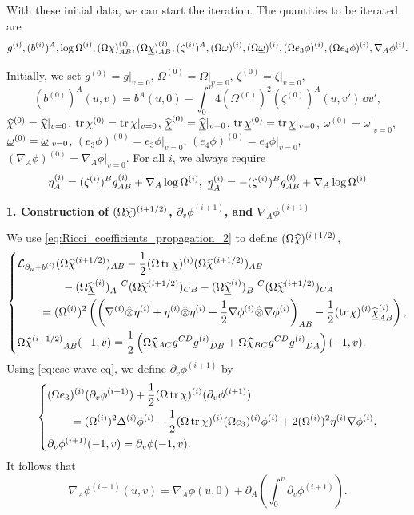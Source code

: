 With these initial data, we can start the iteration.
The quantities to be iterated are 
\[g^{(i)},(b^{(i)})^A,\log\Omega^{(i)},(\Omega\chi)^{(i)}_{AB},(\Omega\underline\chi)^{(i)}_{AB},(\zeta^{(i)})^A,(\Omega\omega)^{(i)},(\Omega\underline\omega)^{(i)},(\Omega e_3\phi)^{(i)}, (\Omega e_4\phi)^{(i)},\nabla_A\phi^{(i)} .\]

Initially, we set $g^{(0)}=g|_{v=0}$, $\Omega^{(0)}=\Omega|_{v=0}$, $\zeta^{(0)}=\zeta|_{v=0}$,
\[
 (b^{(0)})^A(u,v)=b^A(u,0)-\int_0^v4(\Omega^{(0)})^2
 (\zeta^{(0)})^A(u,v')\,\dd v',
\]
$\widehat\chi^{(0)}=\widehat\chi|_{v=0}$, $\operatorname{tr}\chi^{(0)}=\operatorname{tr}\chi|_{v=0}$, $\widehat{\underline\chi}^{(0)}=\widehat{\underline\chi}|_{v=0}$, $\operatorname{tr}\underline\chi^{(0)}=\operatorname{tr}\underline\chi|_{v=0}$, $\omega^{(0)}=\omega|_{v=0}$, $\underline\omega^{(0)}=\underline\omega|_{v=0}$, $(e_3\phi)^{(0)}=e_3\phi|_{v=0}$, $(e_4\phi)^{(0)}=e_4\phi|_{v=0}$, $(\nabla_A\phi)^{(0)}=\nabla_A\phi|_{v=0}$.
For all $i$, we always require 
\[\eta^{(i)}_A=(\zeta^{(i)})^B g^{(i)}_{AB}+\nabla_A\log\Omega^{(i)},\ \underline\eta^{(i)}_A=-(\zeta^{(i)})^B g^{(i)}_{AB}+\nabla_A\log\Omega^{(i)}\]

\noindent\textbf{1. Construction of $(\Omega\widehat\chi)^{(i+1/2)}$, $\partial_v\phi^{(i+1)}$, and $\nabla_A\phi^{(i+1)}$}

We use \eqref{eq:Ricci_coefficients_propagation_2} to define $(\Omega\widehat\chi)^{(i+1/2)}$,
\begin{equation}
    \left\{
    \begin{aligned}
        & \mathcal L_{\partial_u+b^{(i)}}(\Omega\widehat\chi^{(i+1/2)})_{AB}-\frac{1}{2}(\Omega\operatorname{tr}\underline\chi)^{(i)}(\Omega\widehat\chi^{(i+1/2)})_{AB}\\
        &\qquad\qquad -(\Omega\widehat{\underline\chi}^{(i)})_A^{\quad C}(\Omega\widehat\chi^{(i+1/2)})_{CB}-(\Omega\widehat{\underline\chi}^{(i)})_B^{\quad C}(\Omega\widehat\chi^{(i+1/2)})_{CA} \\
        &\qquad =(\Omega^{(i)})^2\left(\left(\nabla^{(i)}{\hat\otimes}\eta^{(i)}+\eta^{(i)}{\hat\otimes}\eta^{(i)}+\frac{1}{2}\nabla\phi^{(i)}\hat\otimes\nabla\phi^{(i)}\right)_{AB}-\frac{1}{2}(\operatorname{tr}\chi)^{(i)}{\widehat{\underline\chi}^{(i)}}_{AB}\right),\\
        &{\Omega\widehat\chi^{(i+1/2)}}_{AB}(-1,v)=\frac{1}{2}\left(\Omega\widehat\chi_{AC}g^{CD}{g^{(i)}}_{DB}+\Omega\widehat\chi_{BC}g^{CD}{g^{(i)}}_{DA}\right)(-1,v).
    \end{aligned}
    \right.
\end{equation}
Using \eqref{eq:ese-wave-eq}, we define $\partial_v\phi^{(i+1)}$ by
\begin{equation}
    \left\{\begin{aligned}
        &(\Omega e_3)^{(i)}(\partial_v\phi^{(i+1)})+\frac{1}{2}(\Omega\operatorname{tr}\underline\chi)^{(i)}(\partial_v\phi^{(i+1)})\\
        &\qquad =(\Omega^{(i)})^2\Delta^{(i)}\phi^{(i)}-\frac{1}{2}(\Omega\operatorname{tr}\chi)^{(i)}(\Omega e_3)^{(i)}\phi^{(i)}+2(\Omega^{(i)})^2\eta^{(i)}\nabla\phi^{(i)},\\
        &\partial_v\phi^{(i+1)}(-1,v)=\partial_v\phi(-1,v).
    \end{aligned}\right.
\end{equation}
It follows that
\[\nabla_A\phi^{(i+1)}(u,v)=\nabla_A\phi(u,0)+\partial_A\left(\int_0^v\partial_v\phi^{(i+1)}\right).\]


